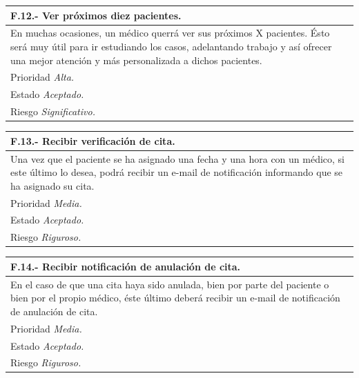 \documentclass[a4paper,oneside,11pt]{book}
\begin{document}
\begin{center}
\begin{tabulary}{15cm}{|L|}
	\hline
		\bf{F.12.- Ver próximos diez pacientes.} \\
	\hline
		En muchas ocasiones, un médico querrá ver sus próximos X pacientes. Ésto será muy útil para ir estudiando los casos, adelantando trabajo y así ofrecer una mejor atención y más personalizada a dichos pacientes. \\
	\hline
		Prioridad \textit{Alta.} \\
	\hline
		Estado \textit{Aceptado.} \\
	\hline
		Riesgo \textit{Significativo.} \\
	\hline
\end{tabulary}
\end{center}

\begin{center}
\begin{tabulary}{15cm}{|L|}
	\hline
		\bf{F.13.- Recibir verificación de cita.} \\
	\hline
		Una vez que el paciente se ha asignado una fecha y una hora con un médico, si este último lo desea, podrá recibir un e-mail de notificación informando que se ha asignado su cita. \\
	\hline
		Prioridad \textit{Media.} \\
	\hline
		Estado \textit{Aceptado.} \\
	\hline
		Riesgo \textit{Riguroso.} \\
	\hline
\end{tabulary}
\end{center}

\begin{center}
\begin{tabulary}{15cm}{|L|}
	\hline
		\bf{F.14.- Recibir notificación de anulación de cita.} \\
	\hline
		En el caso de que una cita haya sido anulada, bien por parte del paciente o bien por el propio médico, éste último deberá recibir un e-mail de notificación de anulación de cita. \\
	\hline
		Prioridad \textit{Media.} \\
	\hline
		Estado \textit{Aceptado.} \\
	\hline
		Riesgo \textit{Riguroso.} \\
	\hline
\end{tabulary}
\end{center}
\end{document}
